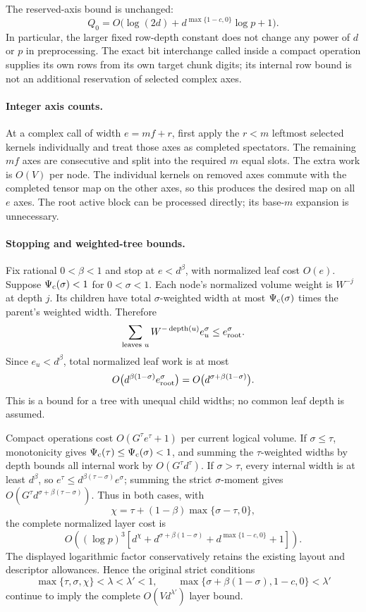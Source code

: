 The reserved-axis bound is unchanged:
\[
 Q_0=O\bigl(\log(2d)+d^{\max\{1-c,0\}}\log p+1\bigr).
\]
In particular, the larger fixed row-depth constant does not change any
power of $d$ or $p$ in preprocessing.  The exact bit interchange called
inside a compact operation supplies its own rows from its own target
chunk digits; its internal row bound is not an additional reservation
of selected complex axes.

\paragraph{Integer axis counts.}
At a complex call of width $e=mf+r$, first apply the $r<m$ leftmost
selected kernels individually and treat those axes as completed
spectators.  The remaining $mf$ axes are consecutive and split into the
required $m$ equal slots.  The extra work is $O(V)$ per node.  The
individual kernels on removed axes commute with the completed tensor
map on the other axes, so this produces the desired map on all $e$
axes.  The root active block can be processed directly; its base-$m$
expansion is unnecessary.

\paragraph{Stopping and weighted-tree bounds.}
Fix rational $0<\beta<1$ and stop at $e<d^\beta$, with normalized leaf
cost $O(e)$.  Suppose $\Psi_{\rm c}(\sigma)<1$ for $0<\sigma<1$.
Each node's normalized volume weight is $W^{-j}$ at depth $j$.  Its
children have total $\sigma$-weighted width at most
$\Psi_{\rm c}(\sigma)$ times the parent's weighted width.  Therefore
\[
 \sum_{\text{leaves }u} W^{-\operatorname{depth}(u)} e_u^\sigma
       \le e_{\rm root}^\sigma.
\]
Since $e_u<d^\beta$, total normalized leaf work is at most
\[
 O\bigl(d^{\beta(1-\sigma)}e_{\rm root}^\sigma\bigr)
       =O\bigl(d^{\sigma+\beta(1-\sigma)}\bigr).
\]
This is a bound for a tree with unequal child widths; no common leaf
depth is assumed.

Compact operations cost $O(G^\tau e^\tau+1)$ per current logical volume.
If $\sigma\le\tau$, monotonicity gives
$\Psi_{\rm c}(\tau)\le\Psi_{\rm c}(\sigma)<1$, and summing the
$\tau$-weighted widths by depth bounds all internal work by
$O(G^\tau d^\tau)$.
If $\sigma>\tau$, every internal width is at least $d^\beta$, so
$e^\tau\le d^{\beta(\tau-\sigma)}e^\sigma$; summing the strict
$\sigma$-moment gives
$O(G^\tau d^{\sigma+\beta(\tau-\sigma)})$.
Thus in both cases, with
\[
 \chi=\tau+(1-\beta)\max\{\sigma-\tau,0\},
\]
the complete normalized layer cost is
\[
 O\!\left((\log p)^3\left[
 d^\chi+d^{\sigma+\beta(1-\sigma)}
 +d^{\max\{1-c,0\}}+1\right]\right).
\]
The displayed logarithmic factor conservatively retains the existing
layout and descriptor allowances.  Hence the original strict conditions
\[
 \max\{\tau,\sigma,\chi\}<\lambda<\lambda'<1,
 \qquad
 \max\{\sigma+\beta(1-\sigma),1-c,0\}<\lambda'
\]
continue to imply the complete $O(Vd^{\lambda'})$ layer bound.

